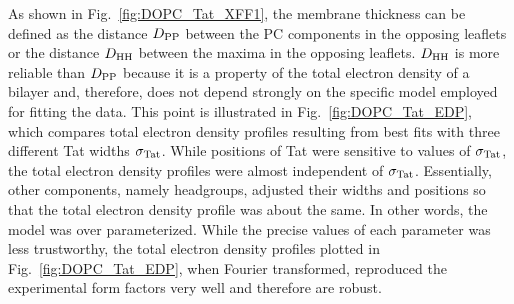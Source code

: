 As shown in Fig.~\ref{fig:DOPC_Tat_XFF1}, the membrane thickness can be defined
as the distance $D_\textrm{PP}$ between the PC components in the opposing leaflets
or the distance $D_\textrm{HH}$ between the maxima in the opposing leaflets. $D_\textrm{HH}$
is more reliable than $D_\textrm{PP}$ because it is a property of the total 
electron density of a bilayer and, therefore, does not depend strongly on the 
specific model employed for fitting the data. 
This point is illustrated in Fig.~\ref{fig:DOPC_Tat_EDP}, which compares total electron
density profiles resulting from best fits with three different Tat widths $\sigma_\textrm{Tat}$.
While positions of Tat were sensitive to values of $\sigma_\textrm{Tat}$, the total 
electron density profiles were almost independent of $\sigma_\textrm{Tat}$. Essentially,
other components, namely headgroups, adjusted their widths and positions so that
the total electron density profile was about the same.  In other words,
the model was over parameterized.
While the precise values of each parameter was less trustworthy,
the total electron density profiles plotted in Fig.~\ref{fig:DOPC_Tat_EDP},
when Fourier transformed, reproduced the experimental form factors very well
and therefore are robust. 

